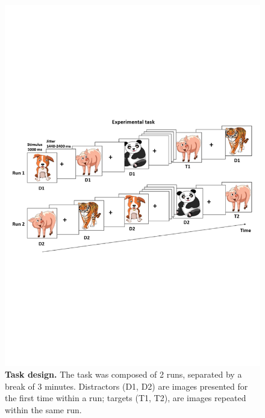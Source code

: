 \begin{figure}[h]
\centering\includegraphics[width=1\linewidth]{images/Ch4/Figure1_fMRIparadigm.pdf}
\caption{\textbf{Task design. }  The task was composed of 2 runs, separated by a break of 3 minutes. Distractors (D1, D2) are images presented for the first time within a run; targets (T1, T2), are images repeated within the same run.}
\end{figure} \label{fig:taskDesign}






